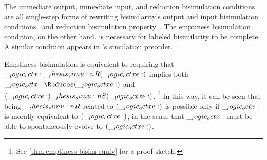 The immediate output, immediate input, and reduction bisimulation conditions are all single-step forms of rewriting bisimilarity's output and input bisimulation conditions~ and reduction bisimulation property~.
The emptiness bisimulation condition, on the other hand, is necessary for labeled bisimilarity to be complete.
A similar condition appears in \textcite{Deng+:MSCS16}'s simulation preorder.

Emptiness bisimulation is equivalent to requiring that $\__logic_octx: \__thesis_simu:n {R} (\__logic_octxe:)$ implies both $\octx \Reduces (\octxe)$ and $(\__logic_octxe:) \__thesis_simu:n {S} (\__logic_octxe:)$.%
\footnote{See \cref{thm:emptiness-bisim-equiv} for a proof sketch.}
In this way, it can be seen that being $\__thesis_simu:n {R}$-related to $(\__logic_octxe:)$ is possible only if $\__logic_octx:$ is morally equivalent to $(\__logic_octxe:)$, in the sense that $\__logic_octx:$ must be able to spontaneously evolve to $(\__logic_octxe:)$.







